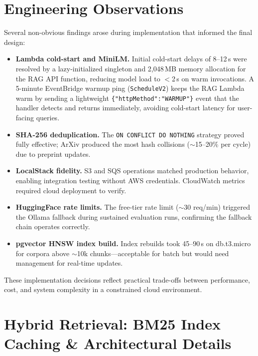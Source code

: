 \section{Engineering Observations}
\label{sec:eng_obs}

Several non-obvious findings arose during implementation that informed the final design:

\begin{itemize}[leftmargin=0.5in]
  \item \textbf{Lambda cold-start and MiniLM.} Initial cold-start delays of 8--12\,s were resolved by a lazy-initialized singleton and 2{,}048\,MB memory allocation for the RAG API function, reducing model load to $<$2\,s on warm invocations. A 5-minute EventBridge warmup ping (\texttt{ScheduleV2}) keeps the RAG Lambda warm by sending a lightweight \texttt{\{"httpMethod":"WARMUP"\}} event that the handler detects and returns immediately, avoiding cold-start latency for user-facing queries.

  \item \textbf{SHA-256 deduplication.} The \texttt{ON CONFLICT DO NOTHING} strategy proved fully effective; ArXiv produced the most hash collisions ($\sim$15--20\% per cycle) due to preprint updates.

  \item \textbf{LocalStack fidelity.} S3 and SQS operations matched production behavior, enabling integration testing without AWS credentials. CloudWatch metrics required cloud deployment to verify.

  \item \textbf{HuggingFace rate limits.} The free-tier rate limit ($\sim$30 req/min) triggered the Ollama fallback during sustained evaluation runs, confirming the fallback chain operates correctly.

  \item \textbf{pgvector HNSW index build.} Index rebuilds took 45--90\,s on db.t3.micro for corpora above $\sim$10k chunks---acceptable for batch but would need management for real-time updates.
\end{itemize}

\noindent These implementation decisions reflect practical trade-offs between performance, cost, and system complexity in a constrained cloud environment.

\section{Hybrid Retrieval: BM25 Index Caching \& Architectural Details}
\label{sec:bm25_caching}

